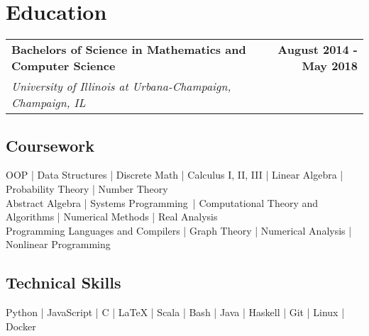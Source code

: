 \documentclass[letterpaper]{article}
\begin{document}
  \setcounter{secnumdepth}{0}

  \section{Education}

  \noindent
  \begin{tabularx}{\textwidth}{@{}X r@{}}
    \textbf{Bachelors of Science in Mathematics and Computer Science} & \textbf{August 2014 - May 2018} \\
    \textit{University of Illinois at Urbana-Champaign, Champaign, IL} &
  \end{tabularx}
   
  \subsection{Coursework}
  \noindent OOP | Data Structures | Discrete Math | Calculus I, II, III | Linear Algebra | Probability Theory | Number Theory \\ 
  Abstract Algebra | Systems Programming \,| Computational Theory and Algorithms | Numerical Methods | Real Analysis \\ Programming Languages and Compilers |  Graph Theory | Numerical Analysis | Nonlinear Programming
  
  \subsection{Technical Skills}
   \noindent Python | JavaScript | C | LaTeX | Scala | Bash | Java |  Haskell | Git | Linux | Docker

\end{document}
